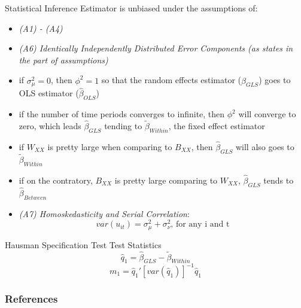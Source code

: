 \documentclass[11pt]{beamer}
\begin{document}
\begin{frame}
Statistical Inference
Estimator is unbiased under the assumptions of:
\begin{itemize}
    \item \textit {(A1) - (A4)}
    \item \textit{(A6) Identically Independently Distributed Error Components (as states in the part of assumptions)}
    \item if $\sigma_\mu^2 = 0$, then $\phi^2 = 1$ so that the random effects estimator ($\widehat \beta_{GLS}$) goes to OLS estimator ($\widehat \beta_{OLS}$)
    \item if the number of time periods converges to infinite, then $\phi^2$ will converge to zero, which leads $\widehat \beta_{GLS}$ tending to $\widetilde \beta_{Within}$, the fixed effect estimator
    \item if $W_{XX}$ is pretty large when comparing to $B_{XX}$, then $\widehat \beta_{GLS}$ will also goes to $\widetilde \beta_{Within}$
    \item if on the contratory, $B_{XX}$ is pretty large comparing to $W_{XX}$, $\widehat \beta_{GLS}$ tends to $\widehat \beta_{Between}$
    \item \textit {(A7) Homoskedasticity and Serial Correlation}:
    \begin{equation}
    var(u_{it}) = \sigma_\mu^2 + \sigma_\nu^2 \text{, for any i and t}
    \end{equation}
\end{itemize}
\end{frame}

\begin{frame}
Hausman Specification Test
Test Statistics
    \begin{equation}
    \widehat q_1 = \widehat \beta_{GLS} - \widetilde \beta_{Within}
    \end{equation}
    \begin{equation}
    m_1 = \widehat q_1'[var(\widehat q_1)]^{-1}\widehat q_1
    \end{equation}
\end{frame}


 {
    \begin{frame}
        \frametitle{}
    \end{frame}

}

\begin{frame}[allowframebreaks]
    \frametitle{References}
    
    \renewcommand{\bibfont}{\normalfont\footnotesize}
    \printbibliography
    
    
\end{frame}
\end{document}
